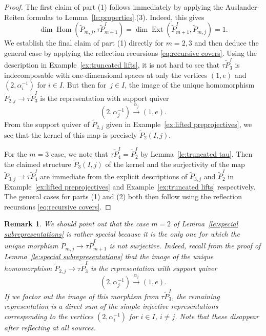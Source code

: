 \documentclass{amsart}
\newtheorem{remark}[theorem]{Remark}
\numberwithin{equation}{section}
\newcommand{\Ext}{\operatorname{Ext}}
\newcommand{\Hom}{\operatorname{Hom}}
\begin{document}
\begin{proof}
  The first claim of part (1) follows immediately by applying the Auslander-Reiten formulas \cite[Theorem IV.2.13]{ass} to Lemma~\ref{le:properties}.(3).
  Indeed, this gives
  \[\dim\Hom(\tilde P_{m,j},\tau\tilde P_{m+1}^I)=\dim\Ext(\tilde P_{m+1}^I,\tilde P_{m,j})=1.\]
  We establish the final claim of part (1) directly for $m=2,3$ and then deduce the general case by applying the reflection recursions \eqref{eq:recursive covers}.
  Using the description in Example~\ref{ex:truncated lifts}, it is not hard to see that $\tau\tilde P_3^I$ is indecomposable with one-dimensional spaces at only the vertices $(1,e)$ and $(2,\alpha_i^{-1})$ for $i\in I$.
  But then for~$j\in I$, the image of the unique homomorphism $\tilde P_{2,j}\to\tau\tilde P_3^I$ is the representation with support quiver
  \[(2,\alpha_j^{-1})\xrightarrow{\alpha_j}(1,e).\]
  From the support quiver of $\tilde P_{2,j}$ given in Example~\ref{ex:lifted preprojectives}, we see that the kernel of this map is precisely $\tilde P_2(I,j)$.

  For the $m=3$ case, we note that $\tau\tilde P_4^I=\tilde P_2^I$ by Lemma~\ref{le:truncated tau}.
  Then the claimed structure $\tilde P_3(I,j)$ of the kernel and the surjectivity of the map $\tilde P_{3,j}\to\tau\tilde P_4^I$ are immediate from the explicit descriptions of $\tilde P_{3,j}$ and $\tilde P_2^I$ in Example~\ref{ex:lifted preprojectives} and Example~\ref{ex:truncated lifts} respectively.
  The general cases for parts (1) and (2) both then follow using the reflection recursions \eqref{eq:recursive covers}.
\end{proof}

\begin{remark}
  \label{rem:special case}
  We should point out that the case $m=2$ of Lemma~\ref{le:special subrepresentations} is rather special because it is the only one for which the unique morphism $\tilde P_{m,j}\to\tau\tilde P_{m+1}^I$ is not surjective.
  Indeed, recall from the proof of Lemma~\ref{le:special subrepresentations} that the image of the unique homomorphism $\tilde P_{2,j}\to\tau\tilde P_3^I$ is the representation with support quiver
  \begin{equation}
    \label{eq:special case}
    (2,\alpha_j^{-1})\xrightarrow{\alpha_j}(1,e).
  \end{equation}
  If we factor out the image of this morphism from $\tau\tilde P_3^I$, the remaining representation is a direct sum of the simple injective representations corresponding to the vertices $(2,\alpha_i^{-1})$ for $i\in I$, $i\ne j$.
  Note that these disappear after reflecting at all sources.
\end{remark}
\end{document}
